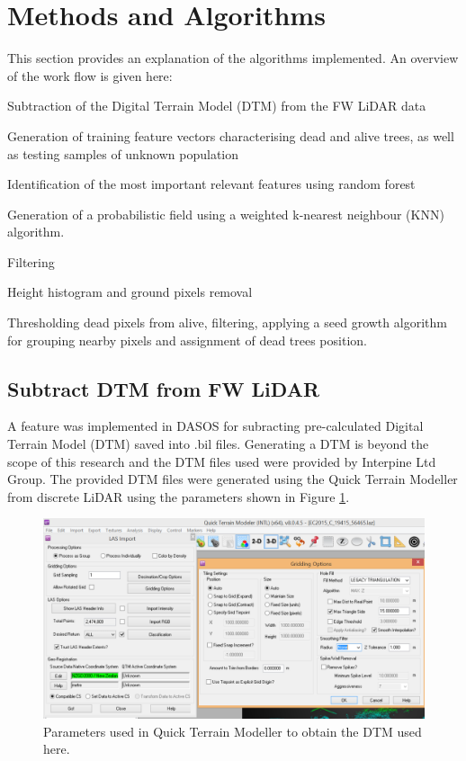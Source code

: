 \documentclass{subfiles}
\begin{document}
\section{Methods and Algorithms}

\par This section provides an explanation of the algorithms implemented. An overview of the work flow is given here: 
\begin{enumerate}
	\item Subtraction of the Digital Terrain Model (DTM) from the FW LiDAR data
	\item {\color{blue} Generation of training feature vectors characterising dead and alive trees, as well as testing samples of unknown population
	\item Identification of the most important relevant features using random forest}
	\item Generation of a probabilistic field using a weighted k-nearest neighbour (KNN) algorithm. 
	\item Filtering 
	\item Height histogram and ground pixels removal
	\item Thresholding dead pixels from alive, filtering, applying a seed growth algorithm for grouping nearby pixels and assignment of dead trees position.  
\end{enumerate}

\subsection{Subtract DTM from FW LiDAR}\label{sec:DTMsub}

\par A feature was implemented in DASOS for subracting pre-calculated Digital Terrain Model (DTM) saved into .bil files. Generating a DTM is beyond the scope of this research and the DTM files used were provided by Interpine Ltd Group. The provided DTM files were generated using the Quick Terrain Modeller from discrete LiDAR using the parameters shown in Figure \ref{fig:DTM_parameters}.

\begin{figure} [h!]
	\centering
	\includegraphics[width=\textwidth]{img/dead/DTM_parameters}
	\caption{Parameters used in Quick Terrain Modeller to obtain the DTM used here.}
	\label{fig:DTM_parameters}
\end{figure}
\end{document}
